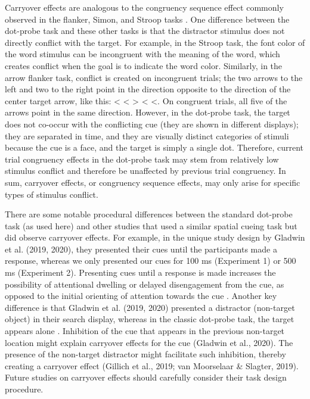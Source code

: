 \documentclass{article}
\begin{document}
{	Carryover effects are analogous to the congruency sequence effect commonly observed in the flanker, Simon, and Stroop tasks \textcite{[object Object]}. One difference between the dot-probe task and these other tasks is that the distractor stimulus does not directly conflict with the target. For example, in the Stroop task, the font color of the word stimulus can be incongruent with the meaning of the word, which creates conflict when the goal is to indicate the word color. Similarly, in the arrow flanker task, c{\color{4472C4}onflict is created on incongruent trials; the two arrows to the left and two to the right point in the direction opposite to the direction of the center target arrow, like this: < < > < <. }{\color{4472C4}On congruent trials, all five of the arrows point in the same direction. }{\color{4472C4}However, in the dot-probe task, the target does not co-occur with the conflicting cue (they are shown in different displays); they are separated in time, and they are visually distinct categories of stimuli because the cue is a face, and the target is simply a single dot. }Therefore, current trial congruency effects in the dot-probe task may stem from relatively low stimulus conflict and therefore be unaffected by previous trial congruency. In sum, carryover effects, or congruency sequence effects, may only arise for specific types of stimulus conflict.



	There are some notable procedural differences between the standard dot-probe task (as used here) and other studies that used a similar spatial cueing task but did observe carryover effects. For example, in the unique study design by \textcite{Gladwin2019a, Gladwin2020a}Gladwin et al. (2019, 2020), they presented their cues until the participants made a response, whereas we only presented our cues for 100 ms (Experiment 1) or 500 ms (Experiment 2). Presenting cues until a response is made increases the possibility of attentional dwelling or delayed disengagement from the cue, as opposed to the initial orienting of attention towards the cue \textcite{[object Object]}. Another key difference is that \textcite{Gladwin2019a, Gladwin2020a}Gladwin et al. (2019, 2020) presented a distractor (non-target object) in their search display, whereas in the classic dot-probe task, the target appears alone \textcite{[object Object]}. Inhibition of the cue that appears in the previous non-target location might explain carryover effects for the cue \parencites{Gladwin2020a}(Gladwin et al., 2020). The presence of the non-target distractor might facilitate such inhibition, thereby creating a carryover effect \parencites{Gillich2019}{Moorselaar2019}(Gillich et al., 2019; van Moorselaar & Slagter, 2019). Future studies on carryover effects should carefully consider their task design procedure.



}
\end{document}
